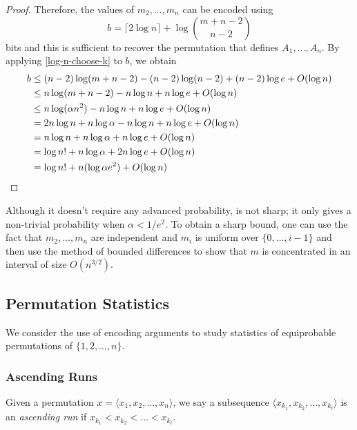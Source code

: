 \documentclass{patmorin}
\begin{document}
\begin{proof}
  Therefore, the values of $m_2,\ldots,m_n$ can be encoded using
  \[
      b = \lceil 2\log n\rceil + \log\binom{m+n-2}{n-2}
  \]
  bits and this is sufficient to recover the permutation that defines
  $A_1,\ldots,A_n$.  By applying \eqref{log-n-choose-k} to $b$, we obtain
  \begin{align*}
    b & \le (n-2)\log(m+n-2) - (n-2)\log(n-2)  + (n-2)\log e + O(\log n) \\
      & \le n\log(m+n-2) - n\log n   + n\log e + O(\log n) \\
      & \le n\log(\alpha n^2) - n\log n  + n\log e + O(\log n) \\
      & = 2n\log n + n\log\alpha - n\log n  + n\log e + O(\log n) \\
      & = n\log n + n\log\alpha + n\log e + O(\log n) \\
      & = \log n! + n\log\alpha + 2n\log e + O(\log n) \\
      & = \log n! + n(\log \alpha e^2) + O(\log n)  \qedhere
  \end{align*}
\end{proof}

\begin{rem}
  Although it doesn't require any advanced probability,
   is not sharp; it only gives a non-trivial
  probability when $\alpha < 1/e^2$.  To obtain a sharp bound, one can
  use the fact that $m_2,\ldots,m_n$ are independent and $m_i$ is uniform
  over $\{0,\ldots,i-1\}$ and then use the method of bounded differences
  \cite{mcdiarmid:on} to show that $m$ is concentrated in an interval
  of size $O(n^{3/2})$.
\end{rem}

\subsection{Permutation Statistics}

We consider the use of encoding arguments to study statistics of
equiprobable permutations of $\{1, 2, \ldots, n\}$.

\subsubsection{Ascending Runs}

Given a permutation $x = \langle x_1, x_2, \ldots, x_n \rangle$, we
say a subsequence $\langle x_{k_1}, x_{k_2}, \ldots, x_{k_t} \rangle$
is an {\em ascending run} if $x_{k_1} < x_{k_2} < \ldots < x_{k_t}$.
\end{document}

